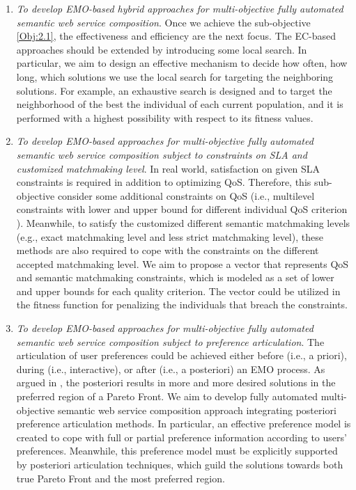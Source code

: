 \begin{enumerate}
\begin{enumerate}
    \item \emph{To develop EMO-based hybrid approaches for multi-objective fully automated semantic web service composition}. Once we achieve the sub-objective \ref{Obj:2.1}, the effectiveness and efficiency are the next focus. The EC-based approaches should be extended by introducing some local search. In particular, we aim to design an effective mechanism to decide how often, how long, which solutions we use the local search for targeting the neighboring solutions. For example, an exhaustive search is designed and to target the neighborhood of the best the individual of each current population, and it is performed with a highest possibility with respect to its fitness values. 

    \item \emph{To develop EMO-based approaches for multi-objective fully automated semantic web service composition subject to constraints on SLA and customized matchmaking level}. In real world, satisfaction on given SLA constraints is required in addition to optimizing QoS. Therefore, this sub-objective consider some additional constraints on  QoS (i.e., multilevel constraints with lower and upper bound for different individual QoS criterion \cite{yin2014hybrid}). Meanwhile, to satisfy the customized different semantic matchmaking levels (e.g., exact matchmaking level and less strict matchmaking level), these methods are also required to cope with the constraints on the different accepted matchmaking level. We aim to propose a vector that represents QoS and semantic matchmaking constraints, which is modeled as a set of lower and upper bounds for each quality criterion. The vector could be utilized in the fitness function for penalizing the individuals that breach the constraints.

    \item \emph{To develop EMO-based approaches for multi-objective fully automated semantic web service composition subject to preference articulation}.  The articulation of user preferences could be achieved either before (i.e., a priori), during (i.e., interactive), or after (i.e., a posteriori) an EMO process. As argued in \cite{giagkiozis2014pareto}, the posteriori results in more and more desired solutions in the preferred region of a Pareto Front. We aim to develop fully automated multi-objective semantic web service composition approach integrating posteriori preference articulation methods. In particular, an effective preference model is created to cope with full or partial preference information according to users' preferences. Meanwhile, this preference model must be explicitly supported by posteriori articulation techniques,  which guild the solutions towards both true Pareto Front and the most preferred region. 


\end{enumerate}
\end{enumerate}
